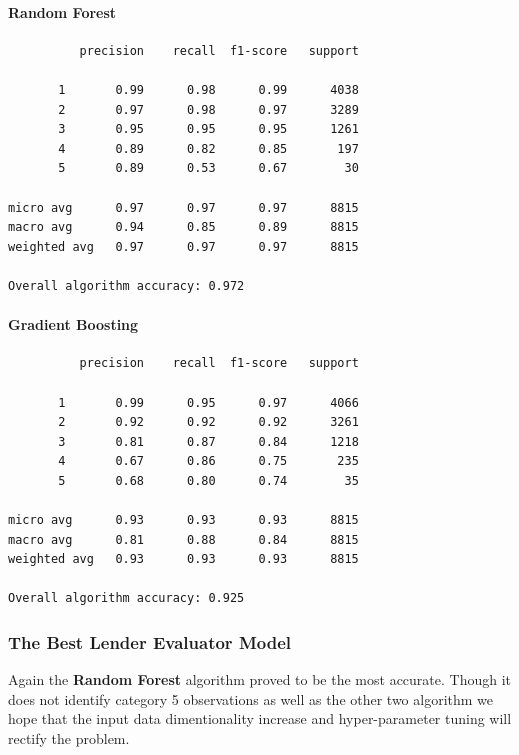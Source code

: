 \hypertarget{random-forest-1}{%
\paragraph{Random Forest}\label{random-forest-1}}

\begin{verbatim}
          precision    recall  f1-score   support

       1       0.99      0.98      0.99      4038
       2       0.97      0.98      0.97      3289
       3       0.95      0.95      0.95      1261
       4       0.89      0.82      0.85       197
       5       0.89      0.53      0.67        30

micro avg      0.97      0.97      0.97      8815
macro avg      0.94      0.85      0.89      8815
weighted avg   0.97      0.97      0.97      8815

Overall algorithm accuracy: 0.972
\end{verbatim}

\hypertarget{gradient-boosting-1}{%
\paragraph{Gradient Boosting}\label{gradient-boosting-1}}

\begin{verbatim}
          precision    recall  f1-score   support

       1       0.99      0.95      0.97      4066
       2       0.92      0.92      0.92      3261
       3       0.81      0.87      0.84      1218
       4       0.67      0.86      0.75       235
       5       0.68      0.80      0.74        35

micro avg      0.93      0.93      0.93      8815
macro avg      0.81      0.88      0.84      8815
weighted avg   0.93      0.93      0.93      8815

Overall algorithm accuracy: 0.925
\end{verbatim}

\hypertarget{the-best-lender-evaluator-model}{%
\subsubsection{The Best Lender Evaluator
Model}\label{the-best-lender-evaluator-model}}

Again the \textbf{Random Forest} algorithm proved to be the most
accurate. Though it does not identify category 5 observations as well as
the other two algorithm we hope that the input data dimentionality
increase and hyper-parameter tuning will rectify the problem.

